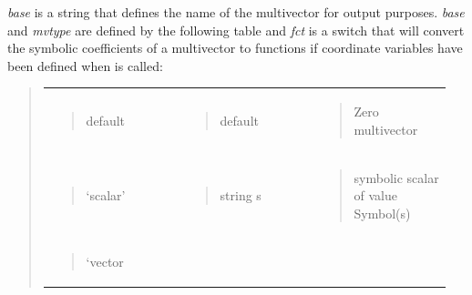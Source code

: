 \documentclass[letterpaper,10pt,english]{sphinxmanual}
\begin{document}
\begin{fulllineitems}
\label{GA:MV}
\emph{base} is a string that defines the name of the multivector for output
purposes. \emph{base} and  \emph{mvtype} are defined by the following table and \emph{fct} is a
switch that will convert the symbolic coefficients of a multivector to functions
if coordinate variables have been defined when {\hyperref[GA:MV.setup]{}} is called:
\begin{quote}

\begin{tabular}{|p{0.317\linewidth}|p{0.317\linewidth}|p{0.317\linewidth}|}
\hline
\textbf{\begin{quote}

mvtype
\end{quote}
} & \textbf{\begin{quote}

base
\end{quote}
} & \textbf{\begin{quote}

result
\end{quote}
}\\\hline
\begin{quote}

default
\end{quote}
 & \begin{quote}

default
\end{quote}
 & \begin{quote}

Zero multivector
\end{quote}
\\\hline
\begin{quote}

`scalar'
\end{quote}
 & \begin{quote}

string s
\end{quote}
 & \begin{quote}

symbolic scalar of value Symbol(s)
\end{quote}
\\\hline
\begin{quote}

`vector
\end{quote}
 & \begin{quote}


\end{quote}
\end{tabular}
\end{quote}
\end{fulllineitems}
\end{document}
